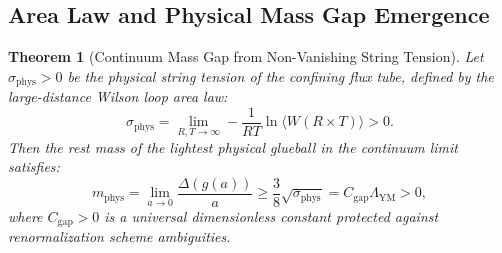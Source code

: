 \documentclass[11pt,reqno]{article}
\newtheorem{theorem}{Theorem}[section]
\begin{document}
\subsection{Area Law and Physical Mass Gap Emergence}
\begin{theorem}[Continuum Mass Gap from Non-Vanishing String Tension]
\label{thm:continuum_mass_gap}
Let $\sigma_{\mathrm{phys}} > 0$ be the physical string tension of the confining flux tube, defined by the large-distance Wilson loop area law:
\begin{equation}
    \label{eq:wilson_area_law}
    \sigma_{\mathrm{phys}} = \lim_{R, T \to \infty} -\frac{1}{R T} \ln \langle W(R \times T) \rangle > 0.
\end{equation}
Then the rest mass of the lightest physical glueball in the continuum limit satisfies:
\begin{equation}
    \label{eq:continuum_gap_lower_bound}
    m_{\mathrm{phys}} = \lim_{a \to 0} \frac{\Delta(g(a))}{a} \ge \frac{3}{8} \sqrt{\sigma_{\mathrm{phys}}} = C_{\mathrm{gap}} \Lambda_{\mathrm{YM}} > 0,
\end{equation}
where $C_{\mathrm{gap}} > 0$ is a universal dimensionless constant protected against renormalization scheme ambiguities.
\end{theorem}
\end{document}
